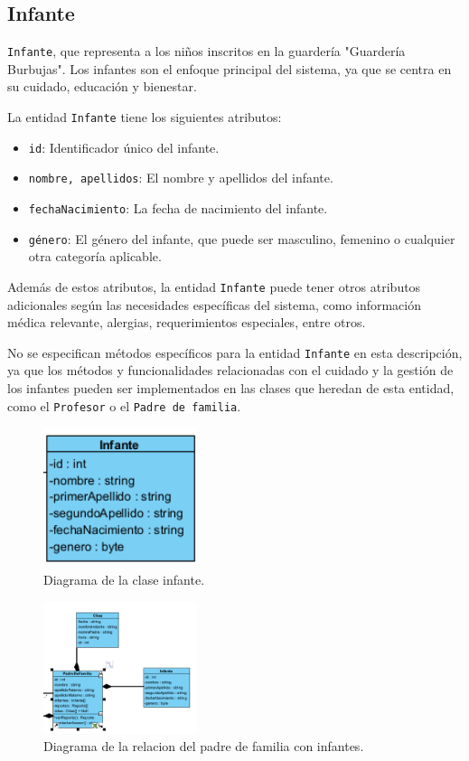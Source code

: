 \subsection{Infante}
\texttt{Infante}, que representa a los niños inscritos en la guardería "Guardería Burbujas". Los infantes son el enfoque principal del sistema, ya que se centra en su cuidado, educación y bienestar.

La entidad \texttt{Infante} tiene los siguientes atributos:

\begin{itemize}
\item \texttt{id}: Identificador único del infante.
\item \texttt{nombre, apellidos}: El nombre y apellidos del infante.
\item \texttt{fechaNacimiento}: La fecha de nacimiento del infante.
\item \texttt{género}: El género del infante, que puede ser masculino, femenino o cualquier otra categoría aplicable.
\end{itemize}

Además de estos atributos, la entidad \texttt{Infante} puede tener otros atributos adicionales según las necesidades específicas del sistema, como información médica relevante, alergias, requerimientos especiales, entre otros.

No se especifican métodos específicos para la entidad \texttt{Infante} en esta descripción, ya que los métodos y funcionalidades relacionadas con el cuidado y la gestión de los infantes pueden ser implementados en las clases que heredan de esta entidad, como el \texttt{Profesor} o el \texttt{Padre de familia}.

\begin{figure}[htbp]
\centering
\includegraphics[width=0.4\textwidth]{images/arqui/infante.png}
\caption{Diagrama de la clase infante.}
\label{fig:entidadinfan}
\end{figure}


\begin{figure}[htbp]
\centering
\includegraphics[width=0.4\textwidth]{images/arqui/colPadreFamilia.png}
\caption{Diagrama de la relacion del padre de familia con infantes.}
\label{fig:entidadpadin}
\end{figure}

